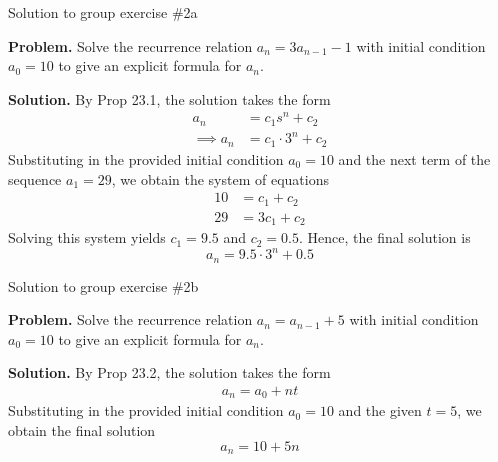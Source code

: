 \documentclass[10pt]{beamer}
\begin{document}
\begin{frame}{Solution to group exercise \#2a}

\textbf{Problem.} Solve the recurrence relation $a_n = 3 a_{n-1} -1$ with initial condition $a_0=10$ to give an explicit formula for $a_n$. 

\vfill 
	
\textbf{Solution.} By Prop 23.1, the solution takes the form 
%
\begin{align*}
a_n &= c_1 s^n + c_2 \\
\implies a_n &= c_1 \cdot 3^n + c_2
\end{align*}
%
Substituting in the provided initial condition $a_0=10$ and the next term of the sequence $a_1 =29$, we obtain the system of equations
%
\begin{align*}
10 &= c_1 + c_2 \\
29 &= 3c_1 + c_2
\end{align*}
%
Solving this system yields $c_1 = 9.5$ and $c_2 = 0.5$.  Hence, the final solution is
\[ a_n = 9.5 \cdot 3^n + 0.5 \]


\end{frame}


\begin{frame}{Solution to group exercise \#2b}

\textbf{Problem.} Solve the recurrence relation  $a_n = a_{n-1} + 5$  with initial condition $a_0=10$ to give an explicit formula for $a_n$. 

\vfill 
	
\textbf{Solution.} By Prop 23.2, the solution takes the form 
%
\begin{align*}
a_n = a_0 + nt
\end{align*}
%
Substituting in the provided initial condition $a_0=10$ and the given $t=5$, we obtain the final solution 
\[ a_n = 10 + 5n \]

\end{frame}
\end{document}
